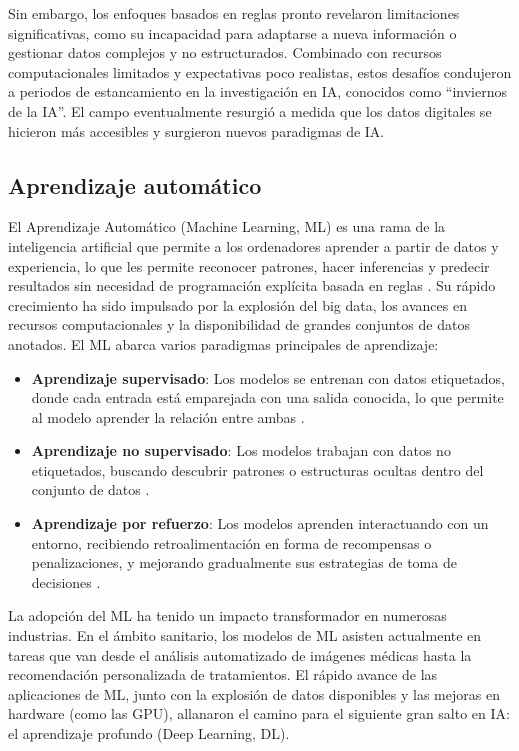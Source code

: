 \documentclass[a4paper,10pt]{book}
\begin{document}
Sin embargo, los enfoques basados en reglas pronto revelaron limitaciones significativas, como su incapacidad para adaptarse a nueva información o gestionar datos complejos y no estructurados. Combinado con recursos computacionales limitados y expectativas poco realistas, estos desafíos condujeron a periodos de estancamiento en la investigación en IA, conocidos como “inviernos de la IA”. El campo eventualmente resurgió a medida que los datos digitales se hicieron más accesibles y surgieron nuevos paradigmas de IA.

\subsection{Aprendizaje automático}

El Aprendizaje Automático (Machine Learning, ML) es una rama de la inteligencia artificial que permite a los ordenadores aprender a partir de datos y experiencia, lo que les permite reconocer patrones, hacer inferencias y predecir resultados sin necesidad de programación explícita basada en reglas \cite{noauthor_what_nodate}. Su rápido crecimiento ha sido impulsado por la explosión del big data, los avances en recursos computacionales y la disponibilidad de grandes conjuntos de datos anotados. El ML abarca varios paradigmas principales de aprendizaje:

\begin{itemize}
\item \textbf{Aprendizaje supervisado}: Los modelos se entrenan con datos etiquetados, donde cada entrada está emparejada con una salida conocida, lo que permite al modelo aprender la relación entre ambas \cite{jiang_supervised_2020}.
\item \textbf{Aprendizaje no supervisado}: Los modelos trabajan con datos no etiquetados, buscando descubrir patrones o estructuras ocultas dentro del conjunto de datos \cite{noauthor_unsupervised_nodate}.
\item \textbf{Aprendizaje por refuerzo}: Los modelos aprenden interactuando con un entorno, recibiendo retroalimentación en forma de recompensas o penalizaciones, y mejorando gradualmente sus estrategias de toma de decisiones \cite{ghasemi_introduction_2024}.
\end{itemize}

La adopción del ML ha tenido un impacto transformador en numerosas industrias. En el ámbito sanitario, los modelos de ML asisten actualmente en tareas que van desde el análisis automatizado de imágenes médicas hasta la recomendación personalizada de tratamientos. El rápido avance de las aplicaciones de ML, junto con la explosión de datos disponibles y las mejoras en hardware (como las GPU), allanaron el camino para el siguiente gran salto en IA: el aprendizaje profundo (Deep Learning, DL).
\end{document}
